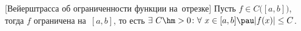 [Вейерштрасса об ограниченности функции на~отрезке]\label{vogr}
Пусть $f\in C\big([a,b]\big)$, тогда $f$ ограничена на~$[a,b]$, то есть $\exists\  C\hm>0\colon \forall\  x\in[a,b]\pau |f(x)|\leq C$.
